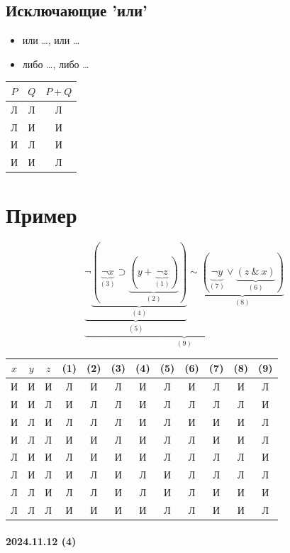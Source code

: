 \documentclass{article}
\begin{document}
\subsection{Исключающие 'или'}
\begin{itemize}
    \item или \dots, или \dots
    \item либо \dots, либо \dots
\end{itemize}

\begin{tabular}{c|c|c}
    $P$ & $Q$ & $P + Q$ \\
    \hline
    Л & Л & Л \\
    Л & И & И \\
    И & Л & И \\
    И & И & Л
\end{tabular}


\section{Пример}
\[
    \underbrace{\underbrace{\neg \underbrace{(\underbrace{\neg x}_{(3)} \supset \underbrace{(y + \underbrace{\neg z}_{(1)})}_{(2)})}_{(4)}}_{(5)} \sim \underbrace{(\underbrace{\neg y}_{(7)} \vee \underbrace{(z ~\&~ x)}_{(6)})}_{(8)}}_{(9)}
\]

\begin{tabular}{c|c|c|c|c|c|c|c|c|c|c|c}
    $x$ & $y$ & $z$ & (1) & (2) & (3) & (4) & (5) & (6) & (7) & (8) & (9) \\
    \hline
    И & И & И & Л & И & Л & И & Л & И & Л & И & Л \\
    И & И & Л & И & Л & Л & И & Л & Л & Л & Л & И \\
    И & Л & И & Л & Л & Л & И & Л & И & И & И & Л \\
    И & Л & Л & И & И & Л & И & Л & Л & И & И & Л \\
    Л & И & И & Л & И & И & И & Л & Л & Л & Л & И \\
    Л & И & Л & И & Л & И & Л & И & Л & Л & Л & Л \\
    Л & Л & И & Л & Л & И & Л & И & Л & И & И & И \\
    Л & Л & Л & И & И & И & И & Л & Л & И & И & Л
\end{tabular}



\newpage
\paragraph{2024.11.12 (4)}
\end{document}
